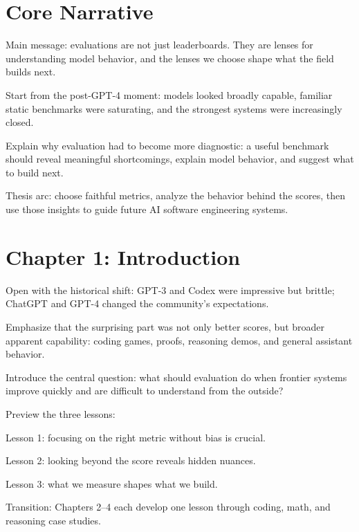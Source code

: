 \documentclass[10pt,twocolumn]{article}
\let\olditemize\itemize
\let\oldenditemize\enditemize
\renewenvironment{itemize}{\olditemize
  \setlength{\itemsep}{1pt}
  \setlength{\parskip}{0pt}
  \setlength{\parsep}{0pt}
  \setlength{\topsep}{2pt}
}{\oldenditemize}
\begin{document}
\footnotesize
{}

\section*{Core Narrative}

\begin{itemize}
  \item Main message: evaluations are not just leaderboards. They are lenses for understanding model behavior, and the lenses we choose shape what the field builds next.
  \item Start from the post-GPT-4 moment: models looked broadly capable, familiar static benchmarks were saturating, and the strongest systems were increasingly closed.
  \item Explain why evaluation had to become more diagnostic: a useful benchmark should reveal meaningful shortcomings, explain model behavior, and suggest what to build next.
  \item Thesis arc: choose faithful metrics, analyze the behavior behind the scores, then use those insights to guide future AI software engineering systems.
\end{itemize}

\section*{Chapter 1: Introduction}

\begin{itemize}
  \item Open with the historical shift: GPT-3 and Codex were impressive but brittle; ChatGPT and GPT-4 changed the community's expectations.
  \item Emphasize that the surprising part was not only better scores, but broader apparent capability: coding games, proofs, reasoning demos, and general assistant behavior.
  \item Introduce the central question: what should evaluation do when frontier systems improve quickly and are difficult to understand from the outside?
  \item Preview the three lessons:
  \begin{itemize}
    \item Lesson 1: focusing on the right metric without bias is crucial.
    \item Lesson 2: looking beyond the score reveals hidden nuances.
    \item Lesson 3: what we measure shapes what we build.
  \end{itemize}
  \item Transition: Chapters 2--4 each develop one lesson through coding, math, and reasoning case studies.
\end{itemize}
\end{document}
